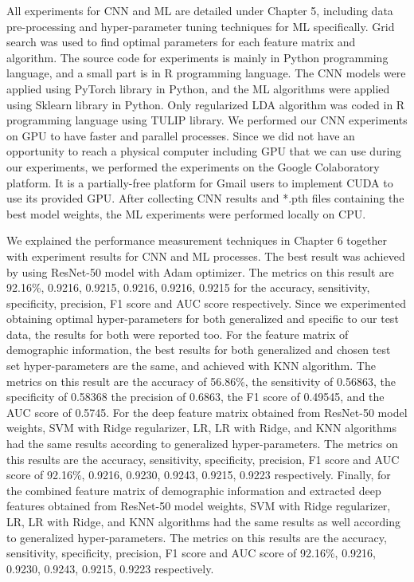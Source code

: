 All experiments for CNN and ML are detailed under Chapter 5, including data pre-processing and hyper-parameter tuning techniques for ML specifically. Grid search was used to find optimal parameters for each feature matrix and algorithm. The source code for experiments is mainly in Python programming language, and a small part is in R programming language. The CNN models were applied using PyTorch library in Python, and the ML algorithms were applied using Sklearn library in Python. Only regularized LDA algorithm was coded in R programming language using TULIP library. We performed our CNN experiments on GPU to have faster and parallel processes. Since we did not have an opportunity to reach a physical computer including GPU that we can use during our experiments, we performed the experiments on the Google Colaboratory platform. It is a partially-free platform for Gmail users to implement CUDA to use its provided GPU. After collecting CNN results and *.pth files containing the best model weights, the ML experiments were performed locally on CPU.

We explained the performance measurement techniques in Chapter 6 together with experiment results for CNN and ML processes. The best result was achieved by using ResNet-50 model with Adam optimizer. The metrics on this result are 92.16\%, 0.9216, 0.9215, 0.9216, 0.9216, 0.9215 for the accuracy, sensitivity, specificity, precision, F1 score and AUC score respectively. Since we experimented obtaining optimal hyper-parameters for both generalized and specific to our test data, the results for both were reported too. For the feature matrix of demographic information, the best results for both generalized and chosen test set hyper-parameters are the same, and achieved with KNN algorithm. The metrics on this result are the accuracy of 56.86\%, the sensitivity of 0.56863, the specificity of 0.58368 the precision of 0.6863, the F1 score of 0.49545, and the AUC score of 0.5745. For the deep feature matrix obtained from ResNet-50 model weights, SVM with Ridge regularizer, LR, LR with Ridge, and KNN algorithms had the same results according to generalized hyper-parameters. The metrics on this results are the accuracy, sensitivity, specificity, precision, F1 score and AUC score of 92.16\%, 0.9216, 0.9230, 0.9243, 0.9215, 0.9223 respectively. Finally, for the combined feature matrix of demographic information and extracted deep features obtained from ResNet-50 model weights, SVM with Ridge regularizer, LR, LR with Ridge, and KNN algorithms had the same results as well according to generalized hyper-parameters. The metrics on this results are the accuracy, sensitivity, specificity, precision, F1 score and AUC score of 92.16\%, 0.9216, 0.9230, 0.9243, 0.9215, 0.9223 respectively.

